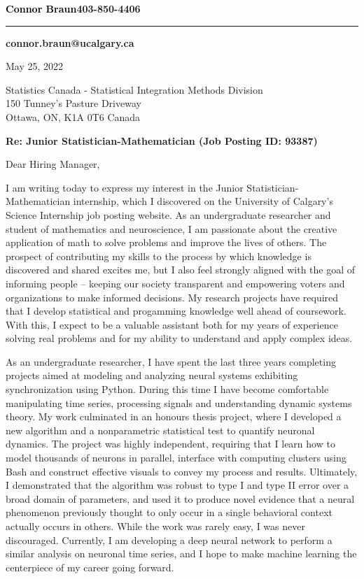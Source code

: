 \documentclass[12pt]{resume}
\begin{document}
\noindent
\begin{minipage}{\textwidth}
    \begin{flushleft}
        \LARGE\bf
        \textcolor{black}{Connor Braun}\hfill\normalsize{\bf403-850-4406}\\[5pt]
        \hrule
        \vspace{4pt}
        \hfill{\bf connor.braun@ucalgary.ca}
    \end{flushleft}
\end{minipage}
    
May 25, 2022

Statistics Canada - Statistical Integration Methods Division\\
150 Tunney's Pasture Driveway\\
Ottawa, ON, K1A 0T6 Canada

{\bf Re: Junior Statistician-Mathematician (Job Posting ID: 93387)}

Dear Hiring Manager,

I am writing today to express my interest in the Junior Statistician-Mathematician internship, which I %
discovered on the University of Calgary's Science Internship job posting website. As an
undergraduate researcher and student of mathematics and neuroscience, I am passionate about the creative 
application of math to solve problems and improve the lives of others. The prospect of contributing my skills
to the process by which knowledge is discovered and shared excites me, 
but I also feel strongly aligned with the goal of informing people -- keeping our society transparent and %
empowering voters and organizations to make informed decisions. My research projects have required that 
I develop statistical and progamming knowledge well ahead of coursework. With this, I expect to be a valuable
assistant both for my years of experience solving real problems and for my ability to understand and apply
complex ideas.
 
As an undergraduate researcher, I have spent the last three years completing projects aimed at modeling and analyzing neural systems exhibiting synchronization using 
Python. During this time I have become comfortable manipulating time series, processing signals and understanding dynamic systems theory. %
My work culminated in an honours thesis project, where I developed a new algorithm and a nonparametric 
statistical test to quantify neuronal dynamics. The project was highly independent, requiring that I learn 
how to model thousands of neurons in parallel, interface with computing clusters using Bash and construct effective 
visuals to convey my process and results. Ultimately, I demonstrated that the algorithm was robust to type I and type II 
error over a broad domain of parameters, and used it to produce novel evidence that a neural phenomenon previously thought to only occur in
a single behavioral context actually occurs in others. While the work was rarely easy, I was never discouraged. Currently, I am developing a
deep neural network to perform a similar analysis on neuronal time series, and I hope to make machine learning the centerpiece of 
my career going forward.
\end{document}
